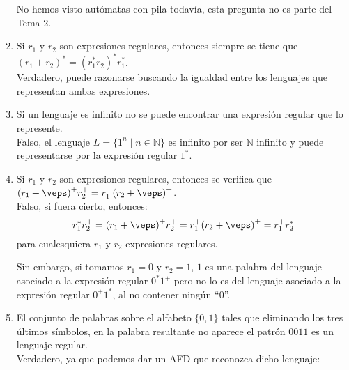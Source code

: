 \begin{enumerate}
        No hemos visto autómatas con pila todavía, esta pregunta no es parte del Tema 2.
    \item Si $r_1$ y $r_2$ son expresiones regulares, entonces siempre se tiene que ${(r_1+r_2)}^{\ast}={(r_1^\ast r_2)}^{\ast}r_1^\ast$.\\

        Verdadero, puede razonarse buscando la igualdad entre los lenguajes que representan ambas expresiones.
    \item Si un lenguaje es infinito no se puede encontrar una expresión regular que lo represente.\\

        Falso, el lenguaje $L=\{1^n \mid n \in \mathbb{N}\}$ es infinito por ser $\mathbb{N}$ infinito y puede representarse por la expresión regular $1^\ast$.
    \item Si $r_1$ y $r_2$ son expresiones regulares, entonces se verifica que ${(r_1+\veps)}^{+}r_2^+ = r_1^+ {(r_2+\veps)}^{+}$.\\

        Falso, si fuera cierto, entonces:
        \begin{equation*}
            r_1^\ast r_2^+ = {(r_1+\veps)}^{+}r_2^+ = r_1^+ {(r_2+\veps)}^{+} = r_1^+ r_2^\ast
        \end{equation*}
        para cualesquiera $r_1$ y $r_2$ expresiones regulares.

        Sin embargo, si tomamos $r_1 = 0$ y $r_2 = 1$, $1$ es una palabra del lenguaje asociado a la expresión regular $0^\ast 1^+$ pero no lo es del lenguaje asociado a la expresión regular $0^+ 1^\ast$, al no contener ningún ``0''.
    \item El conjunto de palabras sobre el alfabeto $\{0,1\}$ tales que eliminando los tres últimos símbolos, en la palabra resultante no aparece el patrón $0011$ es un lenguaje regular.\\

        Verdadero, ya que podemos dar un AFD que reconozca dicho lenguaje:

    \begin{figure}[H]
        \centering
\end{figure}
\end{enumerate}
